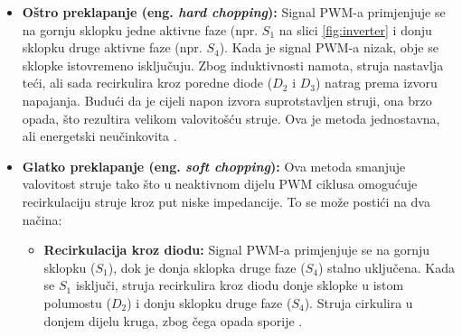 \documentclass[diplomskirad, upload]{fer}
\begin{document}
\begin{itemize}
	\item \textbf{Oštro preklapanje (eng. \textit{hard chopping}):}
	      Signal PWM-a primjenjuje se na gornju sklopku jedne aktivne faze (npr. $S_1$ na slici
	      \ref{fig:inverter} i donju sklopku druge aktivne faze (npr. $S_4$). Kada je signal PWM-a nizak, obje se sklopke istovremeno isključuju. Zbog induktivnosti namota,
	      struja nastavlja teći, ali sada recirkulira kroz poredne diode ($D_2$ i $D_3$) natrag
	      prema izvoru napajanja. Budući da je cijeli napon izvora suprotstavljen struji,
	      ona brzo opada, što rezultira velikom valovitošću struje. Ova je metoda
	      jednostavna, ali energetski neučinkovita \cite{TI2015}.

	\item \textbf{Glatko preklapanje (eng. \textit{soft chopping}):}
	      Ova metoda smanjuje valovitost struje tako što u neaktivnom dijelu PWM
	      ciklusa omogućuje recirkulaciju struje kroz put niske impedancije. To se
	      može postići na dva načina:
	      \begin{itemize}
		      \item \textbf{Recirkulacija kroz diodu:} Signal PWM-a primjenjuje se na
		            gornju sklopku ($S_1$), dok je donja sklopka druge faze ($S_4$) stalno
		            uključena. Kada se $S_1$ isključi, struja recirkulira kroz diodu donje
		            sklopke u istom polumostu ($D_2$) i donju sklopku druge faze ($S_4$).
		            Struja cirkulira u donjem dijelu kruga, zbog čega opada sporije \cite{TI2015}.


\end{itemize}
\end{itemize}
\end{document}
